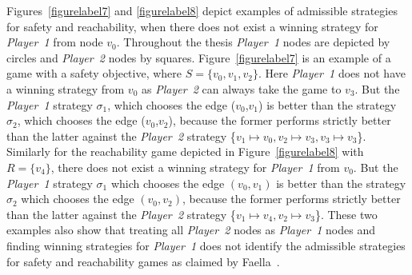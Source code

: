 Figures~\ref{figurelabel7} and \ref{figurelabel8} depict examples of
admissible strategies for safety and reachability, when there does not
exist a winning strategy for \textit{Player~1} from node
$v_{0}$. Throughout the thesis \textit{Player~1} nodes are depicted by
circles and \textit{Player~2} nodes by squares.
Figure~\ref{figurelabel7} is an example of a game with a safety
objective, where $S = \{v_{0},v_{1},v_{2}\}$. Here \textit{Player~1}
does not have a winning strategy from $v_{0}$ as \textit{Player~2} can
always take the game to $v_{3}$. But the \textit{Player~1} strategy
$\sigma_{1}$, which chooses the edge ($v_{0}$,$v_{1}$) is better than
the strategy $\sigma_{2}$, which chooses the edge ($v_{0}$,$v_{2}$),
because the former performs strictly better than the latter against
the \textit{Player~2} strategy \{$v_{1} \mapsto v_{0}, v_{2} \mapsto
v_{3}, v_{3} \mapsto v_{3}$\}. Similarly for the reachability game
depicted in Figure~\ref{figurelabel8} with $R=\{v_4\}$, there does not
exist a winning strategy for \textit{Player~1} from $v_{0}$. But the
\textit{Player~1} strategy $\sigma_{1}$ which chooses the edge
$(v_{0},v_{1})$ is better than the strategy $\sigma_{2}$ which chooses
the edge $(v_{0},v_{2})$, because the former performs strictly better
than the latter against the \textit{Player~2} strategy \{$v_{1}
\mapsto v_{4}, v_{2} \mapsto v_{3}$\}. These two examples also show
that treating all \textit{Player~2} nodes as \textit{Player~1} nodes
and finding winning strategies for \textit{Player~1} does not identify
the admissible strategies for safety and reachability games as claimed
by Faella~\cite{AdmissibleInfiniteGames}.